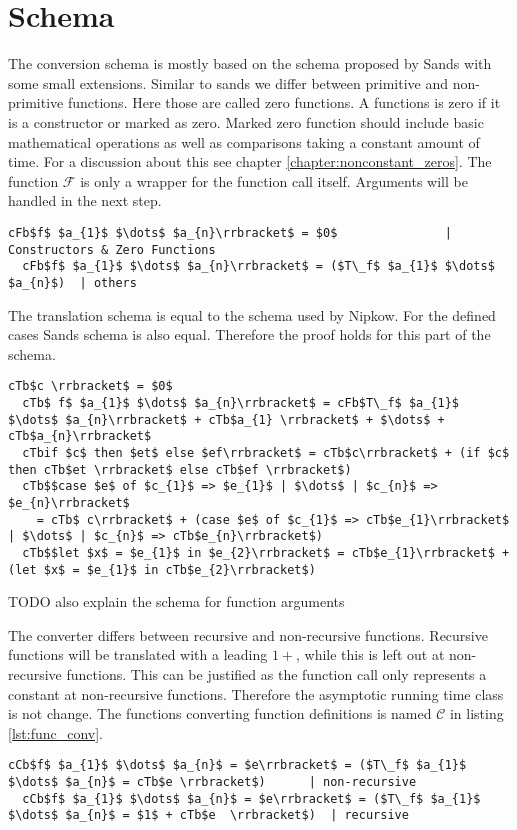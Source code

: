 
\section{Schema} \label{chapter:impl_schema}

The conversion schema is mostly based on the schema proposed by Sands with some small extensions.
Similar to sands we differ between primitive and non-primitive functions.
Here those are called zero functions.
A functions is zero if it is a constructor or marked as zero.
Marked zero function should include basic mathematical operations as well as comparisons taking a constant amount of time.
For a discussion about this see chapter \ref{chapter:nonconstant_zeros}.
The function $\mathcal{F}$ is only a wrapper for the function call itself.
Arguments will be handled in the next step.

\begin{lstlisting}[language=translation,mathescape=true,keepspaces]
  cFb$f$ $a_{1}$ $\dots$ $a_{n}\rrbracket$ = $0$               | Constructors & Zero Functions
  cFb$f$ $a_{1}$ $\dots$ $a_{n}\rrbracket$ = ($T\_f$ $a_{1}$ $\dots$ $a_{n}$)  | others
\end{lstlisting}

The translation schema is equal to the schema used by Nipkow.
For the defined cases Sands schema is also equal.
Therefore the proof holds for this part of the schema.

\begin{lstlisting}[language=translation,mathescape=true,keepspaces]
  cTb$c \rrbracket$ = $0$
  cTb$ f$ $a_{1}$ $\dots$ $a_{n}\rrbracket$ = cFb$T\_f$ $a_{1}$ $\dots$ $a_{n}\rrbracket$ + cTb$a_{1} \rrbracket$ + $\dots$ + cTb$a_{n}\rrbracket$
  cTbif $c$ then $et$ else $ef\rrbracket$ = cTb$c\rrbracket$ + (if $c$ then cTb$et \rrbracket$ else cTb$ef \rrbracket$)
  cTb$$case $e$ of $c_{1}$ => $e_{1}$ | $\dots$ | $c_{n}$ => $e_{n}\rrbracket$
    = cTb$ c\rrbracket$ + (case $e$ of $c_{1}$ => cTb$e_{1}\rrbracket$ | $\dots$ | $c_{n}$ => cTb$e_{n}\rrbracket$)
  cTb$$let $x$ = $e_{1}$ in $e_{2}\rrbracket$ = cTb$e_{1}\rrbracket$ + (let $x$ = $e_{1}$ in cTb$e_{2}\rrbracket$)
\end{lstlisting}

TODO also explain the schema for function arguments

The converter differs between recursive and non-recursive functions.
Recursive functions will be translated with a leading $1+$, while this is left out at non-recursive functions.
This can be justified as the function call only represents a constant at non-recursive functions.
Therefore the asymptotic running time class is not change.
The functions converting function definitions is named $\mathcal{C}$ in listing \ref{lst:func_conv}.

\begin{lstlisting}[language=translation,label=lst:func_conv,caption=Conversion of functions,mathescape=true,keepspaces]
  cCb$f$ $a_{1}$ $\dots$ $a_{n}$ = $e\rrbracket$ = ($T\_f$ $a_{1}$ $\dots$ $a_{n}$ = cTb$e \rrbracket$)      | non-recursive
  cCb$f$ $a_{1}$ $\dots$ $a_{n}$ = $e\rrbracket$ = ($T\_f$ $a_{1}$ $\dots$ $a_{n}$ = $1$ + cTb$e  \rrbracket$)  | recursive
\end{lstlisting}
